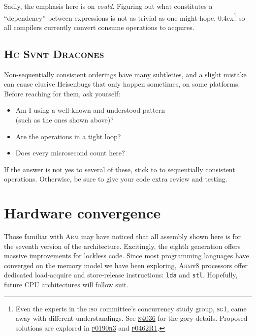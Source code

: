 \documentclass[fontsize=10pt, oneside]{scrartcl}
\newcommand{\punckern}{\kern-0.4ex}
\newcommand{\monobox}[1]{\mbox{\texttt{#1}}}
\newcommand{\keyword}[1]{\monobox{\color{darkGreen}#1}}
\begin{document}
\setcounter{footnote}{0}
Sadly, the emphasis here is on \emph{could}.
Figuring out what constitutes a ``dependency'' between expressions is not as trivial as one might hope,\punckern\footnote{Even the experts in
the \textsc{iso} committee's concurrency study group, \textsc{sg}1,
came away with different understandings.
See
\href{https://www.open-std.org/jtc1/sc22/wg21/docs/papers/2014/n4036.pdf}{\textsc{n}4036}
for the gory details.
Proposed solutions are explored in
\href{https://www.open-std.org/jtc1/sc22/wg21/docs/papers/2017/p0190r3.pdf}{\textsc{p}0190\textsc{r}3}
and
\href{https://www.open-std.org/jtc1/sc22/wg21/docs/papers/2017/p0462r1.pdf}{\textsc{p}0462\textsc{R}1}.
}
so all compilers currently convert consume operations to acquires.

\subsection{\textup{\textsc{Hc Svnt Dracones}}}

Non-sequentially consistent orderings have many subtleties,
and a slight mistake can cause elusive Heisenbugs that only happen sometimes,
on some platforms.
Before reaching for them, ask yourself:
\begin{itemize}[label={}, before=\itshape]
\item Am I using a well-known and understood pattern \\
      (such as the ones shown above)?
\item Are the operations in a tight loop?
\item Does every microsecond count here?
\end{itemize}
If the answer is not yes to several of these,
stick to to sequentially consistent operations.
Otherwise, be sure to give your code extra review and testing.

\section{Hardware convergence}

Those familiar with \textsc{Arm} may have noticed that all assembly shown here is for the seventh version of the architecture.
Excitingly, the eighth generation offers massive improvements for lockless code.
Since most programming languages have converged on the memory model we have been exploring,
\textsc{Arm}v8 processors offer dedicated load-acquire and store-release instructions: \keyword{lda} and \keyword{stl}.
Hopefully, future \textsc{CPU} architectures will follow suit.
\end{document}
